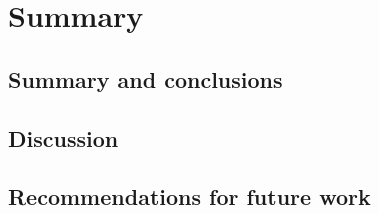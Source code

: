 \chapter{Summary}
\section{Summary and conclusions}
\section{Discussion}
\section{Recommendations for future work}
